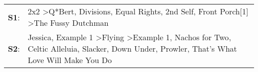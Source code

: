 \begin{supertabular}{p{0.03\textwidth}p{0.92\textwidth}}
 \textbf{S1}:  &                                                                                                                                        2x2\textsuperscript{} \textgreater \enspace Q*Bert\textsuperscript{}, \enspace Divisions\textsuperscript{}, \enspace Equal Rights\textsuperscript{}, \enspace 2nd Self\textsuperscript{}, \enspace Front Porch[1]\textsuperscript{} \textgreater \enspace The Fussy Dutchman\textsuperscript{}  \enspace  \\
 \textbf{S2}:  &  Jessica\textsuperscript{}, \enspace Example 1\textsuperscript{} \textgreater \enspace Flying\textsuperscript{} \textgreater \enspace Example 1\textsuperscript{}, \enspace Nachos for Two\textsuperscript{}, \enspace Celtic Alleluia\textsuperscript{}, \enspace Slacker\textsuperscript{}, \enspace Down Under\textsuperscript{}, \enspace Prowler\textsuperscript{}, \enspace That's What Love Will Make You Do\textsuperscript{}  \enspace  \\
\end{supertabular}
